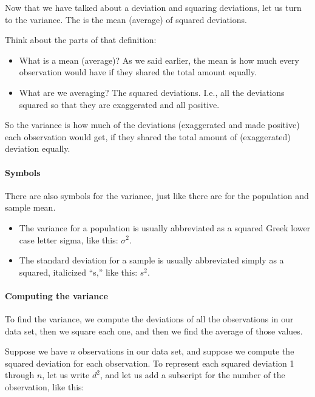 \documentclass[../../../main.tex]{subfiles}
\begin{document}
Now that we have talked about a deviation and squaring deviations, let us turn to the variance. The  is the mean (average) of squared deviations. 

Think about the parts of that definition:

\begin{itemize}

  \item What is a mean (average)? As we said earlier, the mean is how much every observation would have if they shared the total amount equally. 

  \item What are we averaging? The squared deviations. I.e., all the deviations squared so that they are exaggerated and all positive.
  
\end{itemize}

\noindent
So the variance is how much of the deviations (exaggerated and made positive) each observation would get, if they shared the total amount of (exaggerated) deviation equally.


\paragraph{Symbols}

There are also symbols for the variance, just like there are for the population and sample mean.

\begin{itemize}

  \item The variance for a population is usually abbreviated as a squared Greek lower case letter sigma, like this: $\sigma^{2}$.
  
  \item The standard deviation for a sample is usually abbreviated simply as a squared, italicized ``s,'' like this: $s^{2}$. 
  
\end{itemize}


\paragraph{Computing the variance}

To find the variance, we compute the deviations of all the observations in our data set, then we square each one, and then we find the average of those values.

Suppose we have $n$ observations in our data set, and suppose we compute the squared deviation for each observation. To represent each squared deviation 1 through $n$, let us write $d^{2}$, and let us add a subscript for the number of the observation, like this: 
\end{document}
